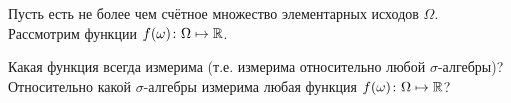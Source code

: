 \begin{task}
Пусть есть не более чем счётное множество элементарных исходов $\Omega$. 
Рассмотрим функции ${f(\omega) \colon \Omega \mapsto \mathbb{R}}$.

Какая функция всегда измерима (т.е. измерима относительно любой ${\sigma \text{-алгебры}}$)? 
Относительно какой ${\sigma \text{-алгебры}}$ измерима любая функция ${f(\omega) \colon \Omega \mapsto \mathbb{R}}$?
\end{task}
